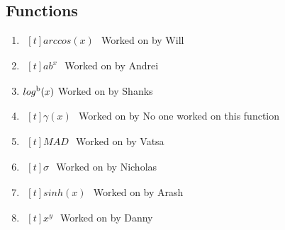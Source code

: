 \documentclass[titlepage]{article}
\begin{document}
    \subsection{Functions}
        \begin{enumerate}
            \item $\begin{aligned}[t]
                arccos(x)
            \end{aligned}$
                Worked on by Will
            
            \item $\begin{aligned}[t]
                ab^x
            \end{aligned}$
                Worked on by Andrei
                
            \item $\begin{aligned}[t]
                log\textsuperscript{b}(x)
            \end{aligned}$
                Worked on by Shanks
                
            \item $\begin{aligned}[t]
                \gamma(x)
            \end{aligned}$
                Worked on by No one worked on this function

            \item $\begin{aligned}[t]
                MAD
            \end{aligned}$
                Worked on by Vatsa

            \item $\begin{aligned}[t]
                \sigma
            \end{aligned}$
                Worked on by Nicholas

            \item $\begin{aligned}[t]
                sinh(x)
            \end{aligned}$
                Worked on by Arash

            \item $\begin{aligned}[t]
                x^y
            \end{aligned}$
                Worked on by Danny
        \end{enumerate}
    
\end{document}
